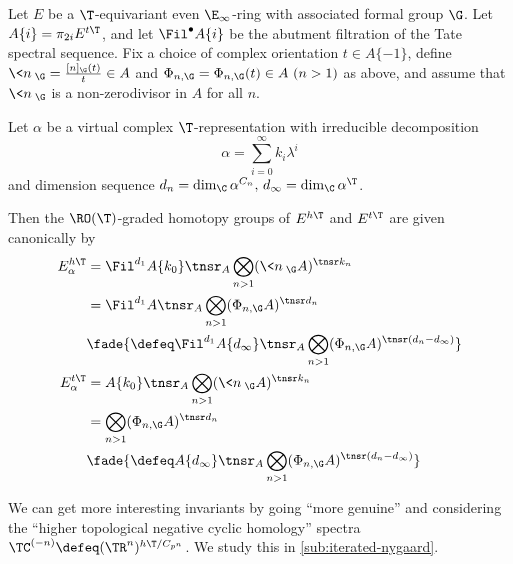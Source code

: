 \begin{theorem}
  \label{thm:even}
  Let $E$ be a $\T$-equivariant even $\E_\infty$-ring with associated formal group $\G$. Let $A\{i\} = \pi_{2i} E^{t\T}$, and let $\Fil^\bullet A\{i\}$ be the abutment filtration of the Tate spectral sequence. Fix a choice of complex orientation $t\in A\{-1\}$, define $\<n\>_\G=\frac{[n]_\G(t)}t\in A$ and $\Phi_{n,\G}=\Phi_{n,\G}(t)\in A\ (n>1)$ as above, and assume that $\<n\>_\G$ is a non-zerodivisor in $A$ for all $n$.

  Let $\alpha$ be a virtual complex $\T$-representation with irreducible decomposition
  \[
    \alpha = \sum_{i=0}^\infty k_i \lambda^i
  \]
  and dimension sequence $d_n = \dim_\C \alpha^{C_n},\, d_\infty = \dim_\C \alpha^\T$.

  Then the $\RO(\T)$-graded homotopy groups of $E^{h\T}$ and $E^{t\T}$ are given canonically by
  \begin{align*}
    E^{h\T}_\alpha
      &= \Fil^{d_1}A\{k_0\}\tnsr_A \bigotimes_{n>1} (\<n\>_\G A)^{\tnsr k_n}\\
      &= \Fil^{d_1} A \tnsr_A \bigotimes_{n>1} (\Phi_{n,\G} A)^{\tnsr d_n}\\
      &\fade{\defeq \Fil^{d_1} A\{d_\infty\} \tnsr_A \bigotimes_{n>1} (\Phi_{n,\G} A)^{\tnsr (d_n-d_\infty)}}\\
    E^{t\T}_\alpha
      &= A\{k_0\}\tnsr_A \bigotimes_{n>1} (\<n\>_\G A)^{\tnsr k_n}\\
      &= \bigotimes_{n>1} (\Phi_{n,\G} A)^{\tnsr d_n}\\
      &\fade{\defeq A\{d_\infty\} \tnsr_A \bigotimes_{n>1} (\Phi_{n,\G} A)^{\tnsr (d_n-d_\infty)}}
  \end{align*}
\end{theorem}

We can get more interesting invariants by going ``more genuine'' and considering the ``higher topological negative cyclic homology'' spectra $\TC^{(-n)} \defeq (\TR^n)^{h\T/C_{p^n}}$. We study this in \sec\ref{sub:iterated-nygaard}.


